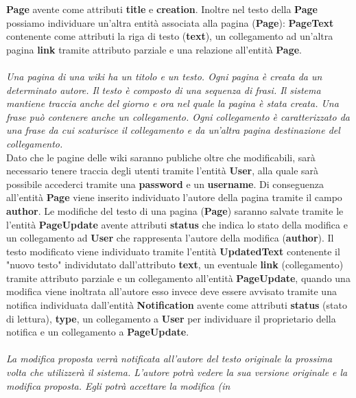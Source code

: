 \documentclass{article}
\begin{document}
	{\textbf {Page}} avente come attributi {\textbf {title}} e {\textbf {creation}}. Inoltre nel testo della {\textbf {Page}} possiamo individuare un'altra entità associata alla pagina ({\textbf {Page}): {\textbf {PageText}} contenente come attributi la riga di testo ({\textbf {text}}), un collegamento ad un'altra pagina \textbf {link} tramite attributo parziale e una relazione all'entità \textbf{Page}.\\ \\
	{\itshape Una pagina di una wiki ha un titolo e un testo. Ogni pagina è creata da un determinato autore. Il testo è
		composto di una sequenza di frasi. Il sistema mantiene traccia anche del giorno e ora nel quale la pagina è
		stata creata. Una frase può contenere anche un collegamento. Ogni collegamento è caratterizzato da una
		frase da cui scaturisce il collegamento e da un’altra pagina destinazione del collegamento.}
	\vspace{0.5cm}
	\\
	Dato che le pagine delle wiki saranno publiche oltre che modificabili, sarà necessario tenere traccia degli utenti tramite l'entità {\textbf {User}}, alla quale sarà possibile accederci tramite una {\textbf {password}} e un {\textbf {username}}. Di conseguenza all'entità {\textbf {Page} viene inserito individuato l'autore della pagina tramite il campo {\textbf {author}}. Le modifiche del testo di una pagina ({\textbf {Page}}) saranno salvate tramite le l'entità {\textbf {PageUpdate}} avente attributi {\textbf {status}} che indica lo stato della modifica e un collegamento ad \textbf{User} che rappresenta l'autore della modifica ({\textbf {author}}}). Il testo modificato viene individuato tramite l'entità {\textbf {UpdatedText}} contenente il "nuovo testo" individutato dall'attributo \textbf{text}, un eventuale \textbf{link} (collegamento) tramite attributo parziale e un collegamento all'entità \textbf{PageUpdate}, quando una modifica viene inoltrata all'autore esso invece deve essere avvisato tramite una notifica individuata dall'entità {\textbf {Notification}} avente come attributi {\textbf {status}} (stato di lettura), {\textbf {type}}, un collegamento a {\textbf{User}} per individuare il proprietario della notifica e un collegamento a \textbf{PageUpdate}. \\ \\
	{\itshape La modifica proposta verrà notificata all’autore del testo originale la prossima volta che utilizzerà il sistema.
		L’autore potrà vedere la sua versione originale e la modifica proposta. Egli potrà accettare la modifica (in
}}
\end{document}
